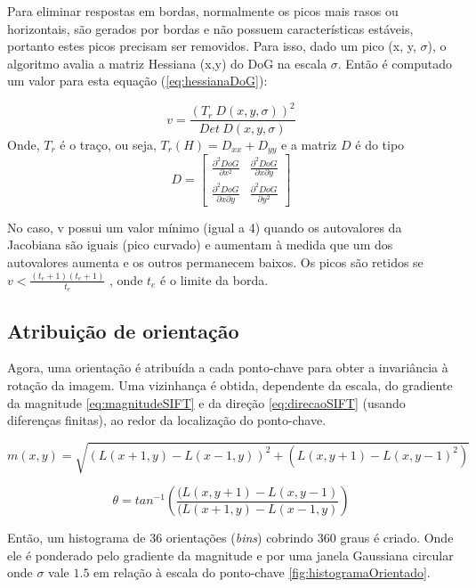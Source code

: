 
Para eliminar respostas em bordas, normalmente os picos mais rasos ou horizontais, são gerados por bordas e não possuem características estáveis, portanto estes picos precisam ser removidos. Para isso, dado um pico (x, y, $\sigma$), o algoritmo avalia a matriz Hessiana (x,y) do DoG na escala $\sigma$. Então é computado um valor para esta equação (\ref{eq:hessianaDoG}):

\begin{equation}
	v = \frac{( T_r \ D(x,y,\sigma))^2}{Det \ D(x,y,\sigma)}
	\label{eq:hessianaDoG}
\end{equation}
Onde, $T_r$ é o traço, ou seja, $T_r(H) = D_{xx} + D_{yy}$ e a matriz $D$ é do tipo
\[D = \begin{bmatrix}
	\frac{\partial ^2 DoG}{\partial x^2} & \frac{\partial ^2 DoG}{\partial x \partial y} \\ 
	\frac{\partial ^2 DoG}{\partial x \partial y} & \frac{\partial ^2 DoG}{\partial y^2} 
\end{bmatrix}
\]

No caso, v possui um valor mínimo (igual a 4) quando os autovalores da Jacobiana são iguais (pico curvado) e aumentam à medida que um dos autovalores aumenta e os outros permanecem baixos. Os picos são retidos se $v  < \frac{(t_e+1)(t_e+1)}{t_e}$ , onde $t_e$ é o limite da borda. 

\subsection*{Atribuição de orientação}

Agora, uma orientação é atribuída a cada ponto-chave para obter a invariância à rotação da imagem. 
Uma vizinhança é obtida, dependente da escala, do gradiente da magnitude \ref{eq:magnitudeSIFT} e da direção \ref{eq:direcaoSIFT} (usando diferenças finitas), ao redor da localização do ponto-chave. 

\begin{equation}
	m(x,y) = \sqrt{(L(x+1,y)-L(x-1,y))^2 + (L(x,y+1)-L(x,y-1)^2)}
	\label{eq:magnitudeSIFT}
\end{equation}

\begin{equation}
	\theta = tan^{-1} \left( \frac{(L(x,y+1)-L(x,y-1)}{(L(x+1,y)-L(x-1,y)}\right)
	\label{eq:direcaoSIFT}
\end{equation}

Então, um histograma de 36 orientações (\emph{bins}) cobrindo 360 graus é criado. Onde ele é ponderado pelo gradiente da magnitude e por uma janela Gaussiana circular onde $\sigma$ vale $1.5$ em relação à escala do ponto-chave \ref{fig:histogramaOrientado}.

